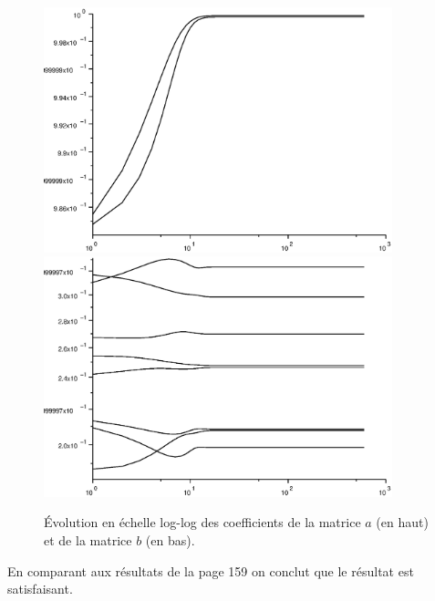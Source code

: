 \documentclass[12pt,a4paper]{article}
\begin{document}
\begin{figure}[H]
	\centering
	\includegraphics[width=0.9\textwidth]{images/figure7.eps} \\
	\includegraphics[width=0.9\textwidth]{images/figure8.eps}
	\caption{Évolution en échelle log-log des coefficients de la matrice $a$ (en haut) et de la matrice $b$ (en bas).}
\end{figure}

En comparant aux résultats de la page 159 on conclut que le résultat est satisfaisant.
\end{document}
